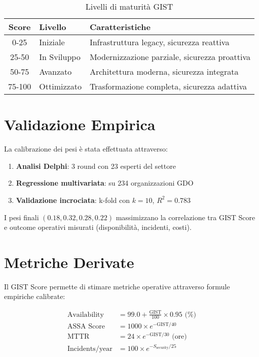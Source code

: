 \begin{table}[H]
\centering
\caption{Livelli di maturità GIST}
\begin{tabular}{c l l}
\toprule
\textbf{Score} & \textbf{Livello} & \textbf{Caratteristiche} \\
\midrule
0-25 & Iniziale & Infrastruttura legacy, sicurezza reattiva \\
25-50 & In Sviluppo & Modernizzazione parziale, sicurezza proattiva \\
50-75 & Avanzato & Architettura moderna, sicurezza integrata \\
75-100 & Ottimizzato & Trasformazione completa, sicurezza adattiva \\
\bottomrule
\end{tabular}
\end{table}

\section{\texorpdfstring{Validazione Empirica}{B.5 - Validazione Empirica}}

La calibrazione dei pesi è stata effettuata attraverso:

\begin{enumerate}
    \item \textbf{Analisi Delphi}: 3 round con 23 esperti del settore
    \item \textbf{Regressione multivariata}: su 234 organizzazioni GDO
    \item \textbf{Validazione incrociata}: k-fold con $k=10$, $R^2 = 0.783$
\end{enumerate}

I pesi finali $(0.18, 0.32, 0.28, 0.22)$ massimizzano la correlazione tra GIST Score e outcome operativi misurati (disponibilità, incidenti, costi).

\section{\texorpdfstring{Metriche Derivate}{B.6 - Metriche Derivate}}

Il GIST Score permette di stimare metriche operative attraverso formule empiriche calibrate:

\begin{align}
\text{Availability} &= 99.0 + \frac{\text{GIST}}{100} \times 0.95 \text{ (\%)} \\
\text{ASSA Score} &= 1000 \times e^{-\text{GIST}/40} \\
\text{MTTR} &= 24 \times e^{-\text{GIST}/30} \text{ (ore)} \\
\text{Incidents/year} &= 100 \times e^{-S_{\text{security}}/25}
\end{align}

